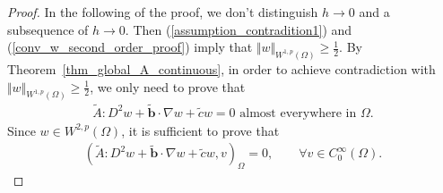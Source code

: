 \documentclass[12pt]{amsart}
\theoremstyle{definition}
\theoremstyle{remark}
\begin{document}
\begin{proof}
In the following of the proof, we don't distinguish $h \rightarrow 0$ 
and a subsequence of $h \rightarrow 0$.
Then (\ref{assumption_contradition1}) and (\ref{conv_w_second_order_proof}) imply that $\Vert w\Vert_{W^{1,p}(\Omega)} 
\geq \frac{1}{2}$. By Theorem~\ref{thm_global_A_continuous}, in order to achieve contradiction with 
$\Vert w\Vert_{W^{1,p}(\Omega)} \geq \frac{1}{2}$, we only need to prove that 
\begin{align*}
\tilde{A}: D^{2} w + \tilde{\boldsymbol{b}}\cdot \nabla w 
+ \tilde{c} w = 0 \text{ almost everywhere in } \Omega. 
\end{align*}
Since $w \in W^{2,p}(\Omega)$, 
it is sufficient to prove that 
\begin{align}
\label{statement_contradiction1}
 (\tilde{A}:D^{2}w + \tilde{\boldsymbol{b}}\cdot \nabla w + \tilde{c} w, 
 v)_{\Omega}  = 0, \qquad \forall v \in C_{0}^{\infty}(\Omega).
\end{align}


\end{proof}
\end{document}
